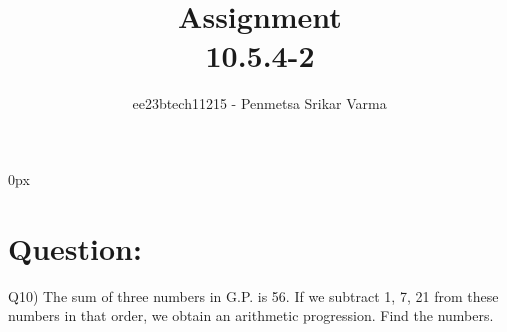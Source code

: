 \documentclass[beamer]{IEEEtran}
\theoremstyle{remark}
\begin{document}
\parindent 0px


\title{Assignment\\[1ex]10.5.4-2}
\author{ee23btech11215 - Penmetsa Srikar Varma$^{}$%
}
\maketitle
\newpage
\bigskip

\renewcommand{\thefigure}{\theenumi}
\renewcommand{\thetable}{\theenumi}
\section*{Question:}
Q10) The sum of three numbers in G.P. is 56. If we subtract 1, 7, 21 from these numbers in that order, we obtain an arithmetic progression. Find the numbers.
\end{document}
